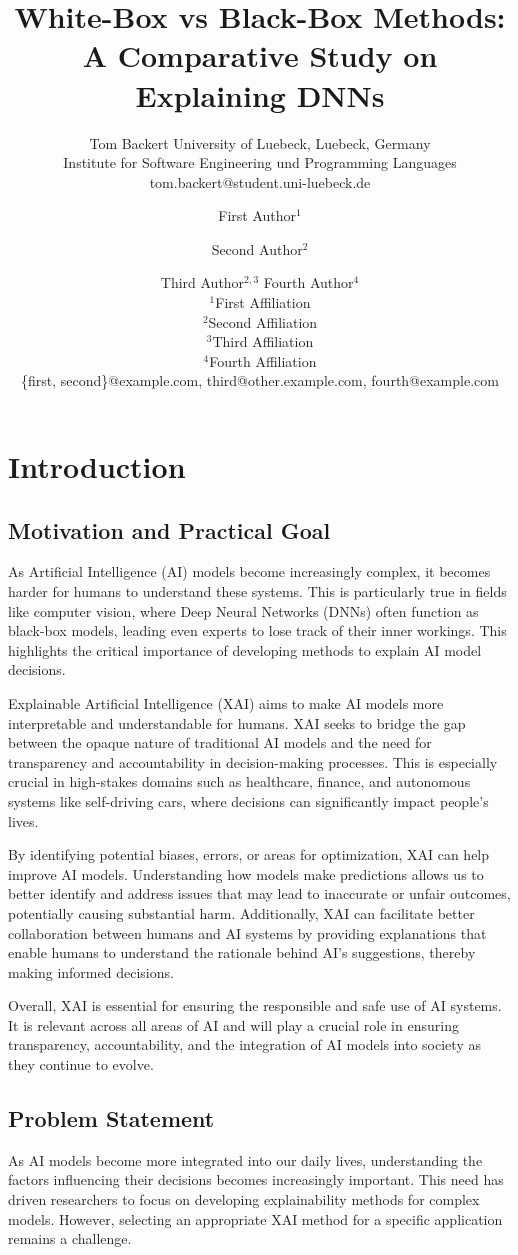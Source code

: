 \documentclass{article}
\title{White-Box vs Black-Box Methods: A Comparative Study on Explaining DNNs}
\author{
    Tom Backert
    \affiliations
    University of Luebeck, Luebeck, Germany\\
    Institute for Software Engineering und Programming Languages
    \emails
    tom.backert@student.uni-luebeck.de
}
\author{
First Author$^1$
\and
Second Author$^2$\and
Third Author$^{2,3}$\And
Fourth Author$^4$\\
\affiliations
$^1$First Affiliation\\
$^2$Second Affiliation\\
$^3$Third Affiliation\\
$^4$Fourth Affiliation\\
\emails
\{first, second\}@example.com,
third@other.example.com,
fourth@example.com
}
\begin{document}
\maketitle

\begin{abstract}
\end{abstract}

\section{Introduction}
\subsection{Motivation and Practical Goal}
As Artificial Intelligence (AI) models become increasingly complex, it becomes harder for humans to understand these systems. This is particularly true in fields like computer vision, where Deep Neural Networks (DNNs) often function as black-box models, leading even experts to lose track of their inner workings. This highlights the critical importance of developing methods to explain AI model decisions.

Explainable Artificial Intelligence (XAI) aims to make AI models more interpretable and understandable for humans. XAI seeks to bridge the gap between the opaque nature of traditional AI models and the need for transparency and accountability in decision-making processes. This is especially crucial in high-stakes domains such as healthcare, finance, and autonomous systems like self-driving cars, where decisions can significantly impact people’s lives.

By identifying potential biases, errors, or areas for optimization, XAI can help improve AI models. Understanding how models make predictions allows us to better identify and address issues that may lead to inaccurate or unfair outcomes, potentially causing substantial harm. Additionally, XAI can facilitate better collaboration between humans and AI systems by providing explanations that enable humans to understand the rationale behind AI’s suggestions, thereby making informed decisions.

Overall, XAI is essential for ensuring the responsible and safe use of AI systems. It is relevant across all areas of AI and will play a crucial role in ensuring transparency, accountability, and the integration of AI models into society as they continue to evolve.

\subsection{Problem Statement}
As AI models become more integrated into our daily lives, understanding the factors influencing their decisions becomes increasingly important. This need has driven researchers to focus on developing explainability methods for complex models. However, selecting an appropriate XAI method for a specific application remains a challenge.
\end{document}
